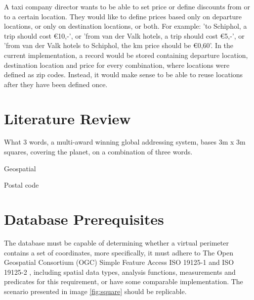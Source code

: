 A taxi company director wants to be able to set price or define discounts from or to a certain location. They would like to define prices based only on departure locations, or only on destination locations, or both. For example: 'to Schiphol, a trip should cost \euro 10,-', or 'from van der Valk hotels, a trip should cost \euro 5,-', or 'from van der Valk hotels to Schiphol, the km price should be \euro 0,60'. In the current implementation, a record would be stored containing departure location, destination location and price for every combination, where locations were defined as zip codes. Instead, it would make sense to be able to reuse locations after they have been defined once.

%
\section{Literature Review}

What 3 words, a multi-award winning global addressing system, bases 3m x 3m squares, covering the planet, on a combination of three words.

Geospatial

Postal code


%
\section{Database Prerequisites}
The database must be capable of determining whether a virtual perimeter contains a set of coordinates, more specifically, it must adhere to The Open Geospatial Consortium (OGC) Simple Feature Access ISO 19125-1 \cite{SFA} and ISO 19125-2 \cite{SFS}, including spatial data types, analysis functions, measurements and predicates for this requirement, or have some comparable implementation. The scenario presented in image \ref{fig:square} should be replicable.

